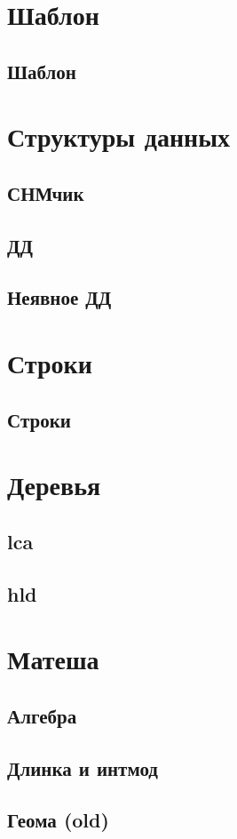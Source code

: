 \documentclass[10pt,landscape,a4paper]{article}
\newcommand{\includecpp}[3]{%
  \subsection{#1}%
}
\begin{document}
\begin{multicols}{3}

\section{Шаблон}
\includecpp{Шаблон}{./algos}{template.cpp}

\section{Структуры данных}

\includecpp{СНМчик}{./algos}{dsu.cpp}
\includecpp{ДД}{./algos}{treap.cpp}
\includecpp{Неявное ДД}{./algos}{implicit_treap.cpp}

\section{Строки}

\includecpp{Строки}{./algos}{strings.cpp}

\section{Деревья}

\includecpp{lca}{./algos}{lca.cpp}
\includecpp{hld}{./algos}{hld.cpp}

\section{Матеша}

\includecpp{Алгебра}{./algos}{algebra.cpp}
\includecpp{Длинка и интмод}{./algos}{long_ar.cpp}
\includecpp{Геома (old)}{./algos}{geometry.cpp}

\end{multicols}
\end{document}
